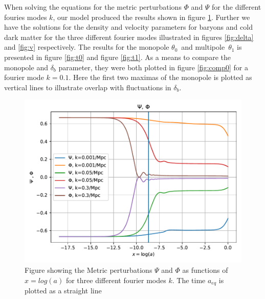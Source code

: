 \documentclass[onecolumn]{aastex62}
\begin{document}
When solving the equations for the metric perturbations $\Phi$ and $\Psi$ for the different fouries modes $k$, our model produced the results shown in figure \ref{fig:Psi}. Further we have the solutions for the density and velocity parameters for baryons and cold dark matter for the three different fourier modes illustrated in figures \ref{fig:delta} and \ref{fig:v} respectively. The results for the monopole $\theta_0$ and multipole $\theta_1$ is presented in figure \ref{fig:t0} and figure \ref{fig:t1}. As a means to compare the monopole and $\delta_b$ parameter, they were both plotted in figure \ref{fig:comp0} for a fourier mode $k=0.1$. Here the first two maximas of the monopole is plotted as vertical lines to illustrate overlap with fluctuations in $\delta_b$.
\begin{figure}
    \includegraphics[scale=0.8]{figures/Psi.pdf}
    \caption{Figure showing the Metric perturbations $\Psi$ and $\Phi$ as functions of $x=log(a)$ for three different fourier modes $k$. The time $a_{eq}$ is plotted as a straight line}
    \label{fig:Psi}
\end{figure}
\end{document}
